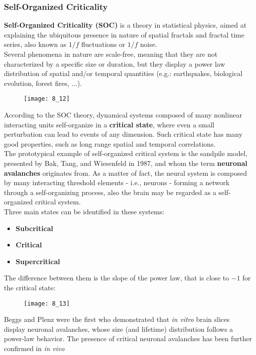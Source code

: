 \subsubsection{Self-Organized Criticality}
\textbf{Self-Organized Criticality (SOC)} is a theory in statistical physics, aimed at
explaining the ubiquitous presence in nature of spatial fractals and fractal time series,
also known as \(1/f\) fluctuations or \(1/f\) noise.\\
Several phenomena in nature are scale-free, meaning that they are not characterized by a
specific size or duration, but they display a power law distribution of spatial and/or
temporal quantities (e.g.: earthquakes, biological evolution, forest fires, ...).
\begin{figure}[H]
    \texttt{[image: 8\_12]}
    \centering
\end{figure}
According to the SOC theory, dynamical systems composed of many nonlinear interacting units
self-organize in a \textbf{critical state}, where even a small perturbation can lead to
events of any dimension. Such critical state has many good properties, such as long range
spatial and temporal correlations.\\
The prototypical example of self-organized critical system is the sandpile model, presented
by Bak, Tang, and Wiesenfeld in 1987, and whom the term \textbf{neuronal avalanches}
originates from. As a matter of fact, the neural system is composed by many interacting
threshold elements - i.e., neurons - forming a network through a self-organizing process,
also the brain may be regarded as a self-organized critical system.\\
Three main states can be identified in these systems:
\begin{itemize}
    \item \textbf{Subcritical}
    \item \textbf{Critical}
    \item \textbf{Supercritical}
\end{itemize}
The difference between them is the slope of the power law, that is close to \(-1\) for the
critical state:
\begin{figure}[H]
    \texttt{[image: 8\_13]}
    \centering
\end{figure}
Beggs and Plenz were the first who demonstrated that \textit{in vitro} brain slices display
neuronal avalanches, whose size (and lifetime) distribution follows a power-law behavior.
The presence of critical neuronal avalanches has been further confirmed in \textit{in vivo}

